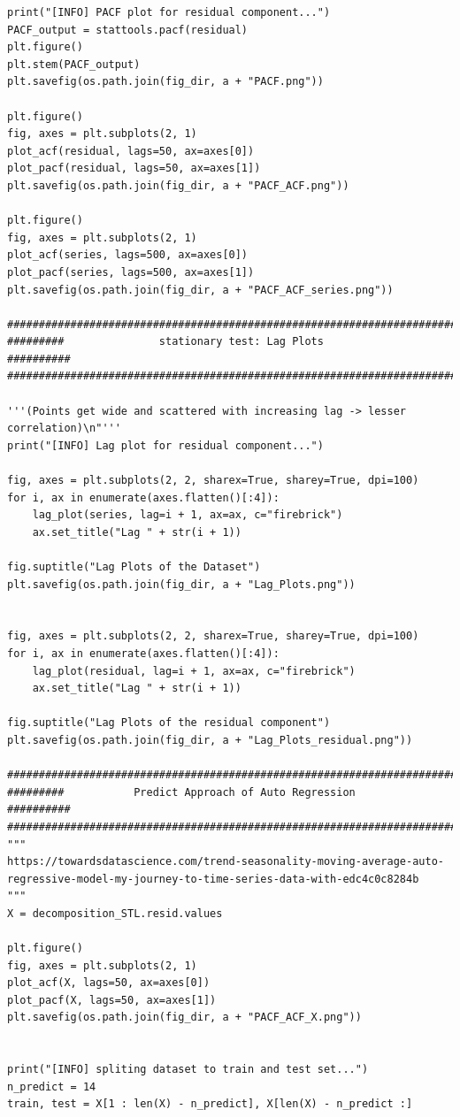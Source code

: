 \documentclass[12pt]{article}
\begin{document}
\begin{lstlisting}
print("[INFO] PACF plot for residual component...")
PACF_output = stattools.pacf(residual)
plt.figure()
plt.stem(PACF_output)
plt.savefig(os.path.join(fig_dir, a + "PACF.png"))

plt.figure()
fig, axes = plt.subplots(2, 1)
plot_acf(residual, lags=50, ax=axes[0])
plot_pacf(residual, lags=50, ax=axes[1])
plt.savefig(os.path.join(fig_dir, a + "PACF_ACF.png"))

plt.figure()
fig, axes = plt.subplots(2, 1)
plot_acf(series, lags=500, ax=axes[0])
plot_pacf(series, lags=500, ax=axes[1])
plt.savefig(os.path.join(fig_dir, a + "PACF_ACF_series.png"))

############################################################################
#########               stationary test: Lag Plots                ##########
############################################################################

'''(Points get wide and scattered with increasing lag -> lesser correlation)\n"'''
print("[INFO] Lag plot for residual component...")

fig, axes = plt.subplots(2, 2, sharex=True, sharey=True, dpi=100)
for i, ax in enumerate(axes.flatten()[:4]):
    lag_plot(series, lag=i + 1, ax=ax, c="firebrick")
    ax.set_title("Lag " + str(i + 1))

fig.suptitle("Lag Plots of the Dataset")
plt.savefig(os.path.join(fig_dir, a + "Lag_Plots.png"))


fig, axes = plt.subplots(2, 2, sharex=True, sharey=True, dpi=100)
for i, ax in enumerate(axes.flatten()[:4]):
    lag_plot(residual, lag=i + 1, ax=ax, c="firebrick")
    ax.set_title("Lag " + str(i + 1))

fig.suptitle("Lag Plots of the residual component")
plt.savefig(os.path.join(fig_dir, a + "Lag_Plots_residual.png"))

############################################################################
#########           Predict Approach of Auto Regression           ##########
############################################################################
"""
https://towardsdatascience.com/trend-seasonality-moving-average-auto-regressive-model-my-journey-to-time-series-data-with-edc4c0c8284b
"""
X = decomposition_STL.resid.values

plt.figure()
fig, axes = plt.subplots(2, 1)
plot_acf(X, lags=50, ax=axes[0])
plot_pacf(X, lags=50, ax=axes[1])
plt.savefig(os.path.join(fig_dir, a + "PACF_ACF_X.png"))


print("[INFO] spliting dataset to train and test set...")
n_predict = 14
train, test = X[1 : len(X) - n_predict], X[len(X) - n_predict :]


\end{lstlisting}
\end{document}
